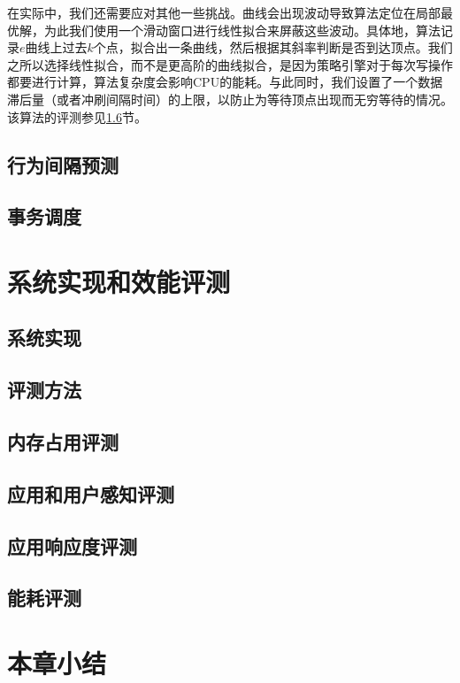 在实际中，我们还需要应对其他一些挑战。曲线会出现波动导致算法定位在局部最优解，为此我们使用一个滑动窗口进行线性拟合来屏蔽这些波动。具体地，算法记录$e$曲线上过去$k$个点，拟合出一条曲线，然后根据其斜率判断是否到达顶点。我们之所以选择线性拟合，而不是更高阶的曲线拟合，是因为策略引擎对于每次写操作都要进行计算，算法复杂度会影响CPU的能耗。与此同时，我们设置了一个数据滞后量（或者冲刷间隔时间）的上限，以防止为等待顶点出现而无穷等待的情况。该算法的评测参见\ref{subsec:energy}节。

\subsection{行为间隔预测}
\label{subsec:interval}

\subsection{事务调度}
\label{subsec:sched}

\section{系统实现和效能评测}

\subsection{系统实现}

\subsection{评测方法}

\subsection{内存占用评测}
\label{subsec:eval-mem}

\subsection{应用和用户感知评测}

\subsection{应用响应度评测}

\subsection{能耗评测}
\label{subsec:energy}

\section{本章小结}

